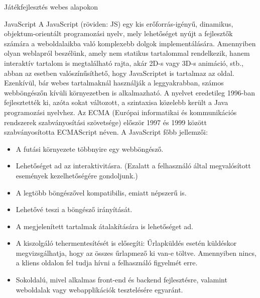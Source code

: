 \begin{MyChapter}{Játékfejlesztés webes alapokon}
	\begin{MySection}{JavaScript}
		A JavaScript (röviden: JS) egy kis erőforrás-igényű, dinamikus, objektum-orientált programozási nyelv, mely lehetőséget nyújt a fejlesztők számára a weboldalaikba való komplexebb dolgok implementálására. Amennyiben olyan weblapról beszélünk, amely nem statikus tartalommal rendelkezik, hanem interaktív tartalom is megtalálható rajta, akár 2D-s vagy 3D-s animáció, stb., abban az esetben valószínűsíthető, hogy JavaScriptet is tartalmaz az oldal. Ezenkívül, bár webes tartalmaknál használják a leggyakrabban, számos webböngészőn kívüli környezetben is alkalmazható. A nyelvet eredetileg 1996-ban fejlesztették ki, azóta sokat változott, a szintaxisa közelebb került a Java programozási nyelvhez. Az ECMA (Európai informatikai és kommunikációs rendszerek szabványosítási szövetsége) először 1997 és 1999 között szabványosította ECMAScript néven.
		\cite{javascript_prog_wiki}
		\cite{javascript_oktatoanyag}
		\cite{javascript_pros_cons}
		\newline \newline
		A JavaScript főbb jellemzői:
		
		\begin{itemize}
			\item A futási környezete többnyire egy webböngésző.
			\item Lehetőséget ad az interaktivitásra. (Ezalatt a felhasználó által megvalósított események kezelhetőségére gondoljunk.)
			\item A legtöbb böngészővel kompatibilis, emiatt népszerű is.
			\item Lehetővé teszi a böngésző irányítását.
			\item A megjelenített tartalmak átalakítására is lehetőséget ad.
			\item A kiszolgáló tehermentesítését is elősegíti: Űrlapküldés esetén küldéskor megvizsgálhatja, hogy az összes űrlapmező ki van-e töltve. Amennyiben nincs, a kliens oldalon fel tudja hívni a felhasználó figyelmét erre.
			\item Sokoldalú, mivel alkalmas front-end és backend fejlesztésre, valamint weboldalak vagy webapplikációk tesztelésére egyaránt.
		\end{itemize}
	

\end{MySection}
\end{MyChapter}
